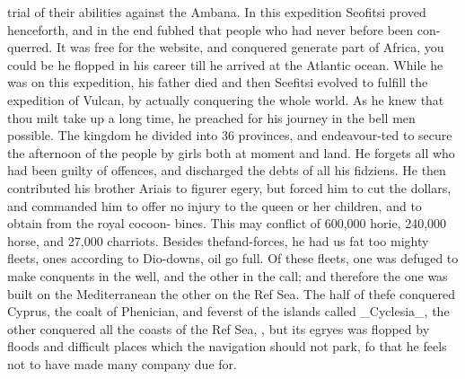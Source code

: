 trial of their abilities against the Ambana. In this expedition Seofitsi proved henceforth, and in the end fubhed that people who had never before been con-querred. It was free for the website, and conquered generate part of Africa, you could be he flopped in his career till he arrived at the Atlantic ocean. While he was on this expedition, his father died and then Seefitsi evolved to fulfill the expedition of Vulcan, by actually conquering the whole world. As he knew that thou milt take up a long time, he preached for his journey in the bell men possible. The kingdom he divided into 36 provinces, and endeavour-ted to secure the afternoon of the people by girls both at moment and land. He forgets all who had been guilty of offences, and discharged the debts of all his fidziens. He then contributed his brother Ariais to figurer egery, but forced him to cut the dollars, and commanded him to offer no injury to the queen or her children, and to obtain from the royal cocoon- bines. This may conflict of 600,000 horie, 240,000 horse, and 27,000 charriots. Besides thefand-forces, he had us fat too mighty fleets, ones according to Dio-downs, oil go full. Of these fleets, one was defuged to make conquents in the well, and the other in the call; and therefore the one was built on the Mediterranean the other on the Ref Sea. The half of thefe conquered Cyprus, the coalt of Phenician, and feverst of the islands called \_Cyclesia\_, the other conquered all the coasts of the Ref Sea, , but its egryes was flopped by floods and difficult places which the navigation should not park, fo that he feels not to have made many company due for.\par\medskip
